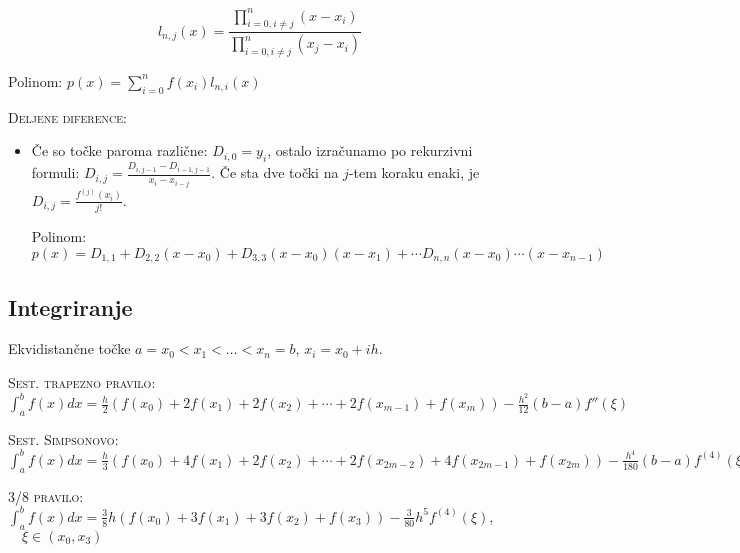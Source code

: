 \documentclass[a4paper,10pt]{article}
\theoremstyle{definition}
\begin{document}
$$l_{n,j}(x)=\frac{\prod_{i=0,i\neq j}^n(x-x_i)}{\prod_{i=0,i\neq j}^n(x_j-x_i)}$$

Polinom: $p(x) = \sum_{i=0}^nf(x_i)l_{n,i}(x)$

\textsc{Deljene diference:}

\begin{itemize}

\item Če so točke paroma različne: $D_{i,0} = y_i$, ostalo izračunamo po
rekurzivni formuli: $D_{i,j} = \frac{D_{i,j-1}-D_{i-1,j-1}}{x_i-x_{i-j}}$. Če
sta dve točki na $j$-tem koraku enaki, je $D_{i,j} = \frac{f^{(j)}(x_i)}{j!}$.

Polinom: $p(x) = D_{1,1} + D_{2,2}(x-x_0) + D_{3,3}(x-x_0)(x-x_1) + \cdots D_{n,n}(x-x_0)\cdots (x-x_{n-1})$

\end{itemize}

\subsection*{Integriranje}

Ekvidistančne točke $a = x_0 < x_1 < \dots < x_n = b$, $x_i = x_0 + ih$.

\textsc{Sest. trapezno pravilo:} $\int_{a}^{b} f(x) dx = \frac{h}{2} (f(x_0)+2f(x_1)
+2f(x_2)+\cdots + 2f(x_{m-1})+f(x_m))-\frac{h^2}{12}(b-a)f''(\xi)$

\textsc{Sest. Simpsonovo:} $\int_{a}^{b} f(x) dx = \frac{h}{3} (f(x_0)+4f(x_1)
+2f(x_2)+\cdots + 2f(x_{2m-2})+4f(x_{2m-1})+f(x_{2m}))-\frac{h^4}{180}(b-a)f^{(4)}(\xi)$

\textsc{3/8 pravilo:} $\int_a^b f(x) dx = \frac{3}{8} h(f(x_0) + 3f(x_1)
+ 3f(x_2) + f(x_3)) - \frac{3}{80} h^5f^{(4)}(\xi )$, $\quad \xi \in (x_0,x_3)$
\end{document}
